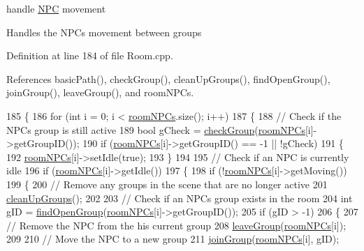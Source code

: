 handle \hyperlink{class_n_p_c}{N\+PC} movement 

Handles the N\+P\+Cs movement between groups 

Definition at line 184 of file Room.\+cpp.



References basic\+Path(), check\+Group(), clean\+Up\+Groups(), find\+Open\+Group(), join\+Group(), leave\+Group(), and room\+N\+P\+Cs.


\begin{DoxyCode}
185 \{
186     \textcolor{keywordflow}{for} (\textcolor{keywordtype}{int} i = 0; i < \hyperlink{class_room_a34bdf24cc8c52d638bcfd851c295f23b}{roomNPCs}.size(); i++)
187     \{
188         \textcolor{comment}{// Check if the NPCs group is still active}
189         \textcolor{keywordtype}{bool} gCheck = \hyperlink{class_room_a0c1e8e264493205408553a998a068b29}{checkGroup}(\hyperlink{class_room_a34bdf24cc8c52d638bcfd851c295f23b}{roomNPCs}[i]->getGroupID());
190         \textcolor{keywordflow}{if} (\hyperlink{class_room_a34bdf24cc8c52d638bcfd851c295f23b}{roomNPCs}[i]->getGroupID() == -1 || !gCheck)
191         \{
192             \hyperlink{class_room_a34bdf24cc8c52d638bcfd851c295f23b}{roomNPCs}[i]->setIdle(\textcolor{keyword}{true});
193         \}
194 
195         \textcolor{comment}{// Check if an NPC is currently idle}
196         \textcolor{keywordflow}{if} (\hyperlink{class_room_a34bdf24cc8c52d638bcfd851c295f23b}{roomNPCs}[i]->getIdle())
197         \{
198             \textcolor{keywordflow}{if} (!\hyperlink{class_room_a34bdf24cc8c52d638bcfd851c295f23b}{roomNPCs}[i]->getMoving())
199             \{
200                 \textcolor{comment}{// Remove any groups in the scene that are no longer active}
201                 \hyperlink{class_room_a03dc1536ef3b1ed301c76b08685e7103}{cleanUpGroups}();
202 
203                 \textcolor{comment}{// Check if an NPCs group exists in the room}
204                 \textcolor{keywordtype}{int} gID = \hyperlink{class_room_a7d4ef90e7eb605f2c198b28175900d45}{findOpenGroup}(\hyperlink{class_room_a34bdf24cc8c52d638bcfd851c295f23b}{roomNPCs}[i]->getGroupID());
205                 \textcolor{keywordflow}{if} (gID > -1)
206                 \{
207                     \textcolor{comment}{// Remove the NPC from the his current group}
208                     \hyperlink{class_room_af6bdbbf116aeafe290a31990a1124562}{leaveGroup}(\hyperlink{class_room_a34bdf24cc8c52d638bcfd851c295f23b}{roomNPCs}[i]);
209 
210                     \textcolor{comment}{// Move the NPC to a new group}
211                     \hyperlink{class_room_a8cf434656fbafb4d65ee47c33db5c8ed}{joinGroup}(\hyperlink{class_room_a34bdf24cc8c52d638bcfd851c295f23b}{roomNPCs}[i], gID);   

\end{DoxyCode}
